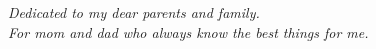 
\begin{addmargin}[-3cm]{0cm}
\thispagestyle{empty}


\vspace*{9cm}

\begin{center}
\slshape
Dedicated to my dear parents and family.\\
For mom and dad who always know the best things for me.
\end{center}

\end{addmargin}

